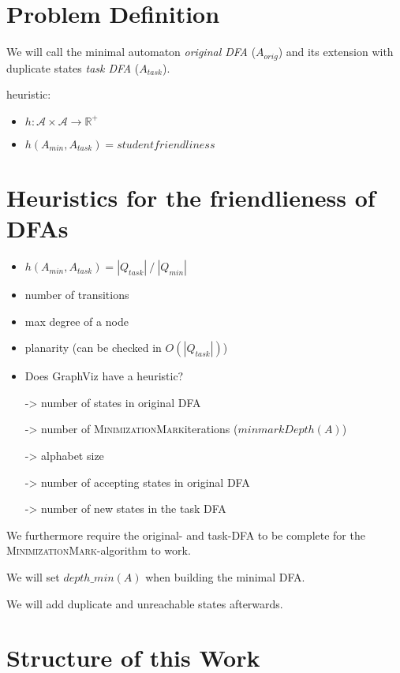 \documentclass[a4paper, oneside, 11pt]{report}
\theoremstyle{definition}
\theoremstyle{remark}
\newcommand{\MinMark}{\textsc{MinimizationMark}}
\begin{document}
\section{Problem Definition}

We will call the minimal automaton \emph{original DFA} ($A_{orig}$) and its extension with duplicate states \emph{task DFA} ($A_{task}$).

heuristic:
\begin{itemize}
	\item $h \colon \mathcal{A} \times \mathcal{A} \to \mathbb{R^+}$
	\item $h(A_{min}, A_{task}) = studentfriendliness$
\end{itemize}

\section{Heuristics for the friendlieness of DFAs}

\begin{itemize}
	\item $h(A_{min}, A_{task}) = |Q_{task}|\ /\ |Q_{min}|$
	\item number of transitions
	\item max degree of a node
	\item planarity (can be checked in $O(|Q_{task}|)$)
	\item Does GraphViz have a heuristic?
	
	\item[->] number of states in original DFA
	\item[->] number of \MinMark iterations ($minmarkDepth(A)$)
	\item[->] alphabet size
	\item[->] number of accepting states in original DFA
	
	\item[->] number of new states in the task DFA
\end{itemize}
We furthermore require the original- and task-DFA to be complete for the \MinMark-algorithm to work.

We will set $depth\_min(A)$ when building the minimal DFA.

We will add duplicate and unreachable states afterwards.

\section{Structure of this Work}
\end{document}
